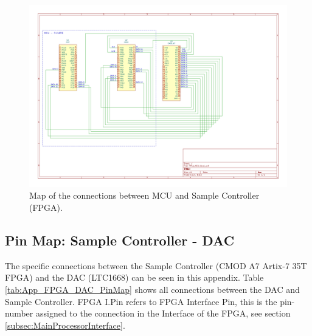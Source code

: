   
\begin{figure}[H]
    \centering
    \includegraphics[clip, trim=40 130 190 40,width=1.0\textwidth]{Appendix/Figures/FPGA_MCU_PinOut.pdf}
    \caption{Map of the connections between MCU and Sample Controller (FPGA).}
    \label{fig_App_MCU_FPGA_PinMap}
\end{figure}


\subsection{Pin Map: Sample Controller - DAC} \label{App:PinMap_FPGA_DAC}
The specific connections between the Sample Controller (CMOD A7 Artix-7 35T FPGA) and the DAC (LTC1668) can be seen in this appendix. Table \ref{tab:App_FPGA_DAC_PinMap} shows all connections between the DAC and Sample Controller. FPGA I.Pin refers to FPGA Interface Pin, this is the
pin-number assigned to the connection in the Interface of the FPGA, see section \ref{subsec:MainProcessorInterface}. 

